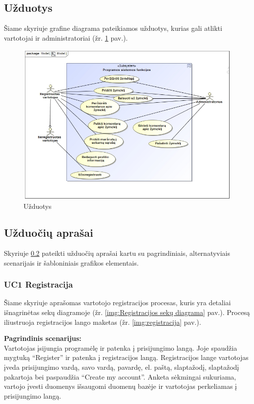 \documentclass{VUMIFPSkursinis}
\begin{document}
\subsection{Užduotys}

Šiame skyriuje grafine diagrama pateikiamos užduotys, kurias gali atlikti vartotojai ir administratoriai (žr. \ref{img:uzduotys} pav.).
	\begin{figure}[H]
				\centering
				\includegraphics[scale=0.5]{img/uzduotys}
				\caption{Užduotys}
				\label{img:uzduotys}
			\end{figure}

\subsection{Užduočių aprašai}
\label{sec:Užduočių aprašai}
Skyriuje \ref{sec:Užduočių aprašai} pateikti užduočių aprašai kartu su pagrindiniais, alternatyviais scenarijais ir šabloniniais grafikos elementais.
\subsubsection{UC1 Registracija}
	Šiame skyriuje aprašomas vartotojo registracijos procesas,  kuris yra detaliai išnagrinėtas sekų diagramoje (žr. \ref{img:Registracijos sekų diagrama} pav.). 
	Procesą iliustruoja registracijos lango maketas (žr. \ref{img:registracija} pav.).

	\textbf{Pagrindinis scenarijus:}\\
	Vartotojas įsijungia programėlę ir patenka į prisijungimo langą. Joje spaudžia mygtuką “Register” ir patenka į registracijos langą. 
	Registracijos lange vartotojas įveda prisijungimo vardą, savo vardą, pavardę, el. paštą, slaptažodį, slaptažodį pakartoja bei paspaudžia 
	“Create my account”. Anketa sėkmingai sukuriama, vartojo įvesti duomenys išsaugomi duomenų bazėje ir vartotojas perkeliamas į prisijungimo langą.
\end{document}
